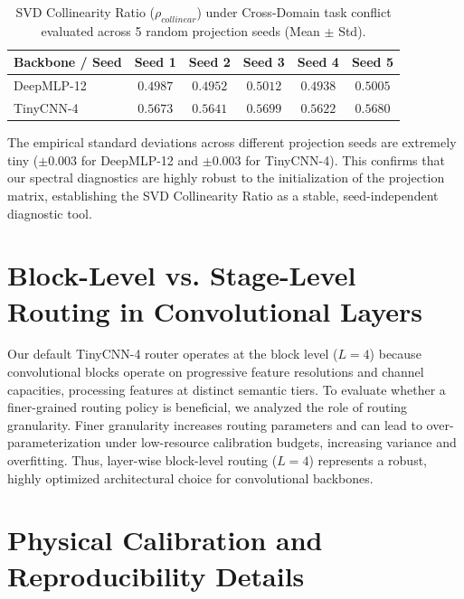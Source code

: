 \begin{table}[H]
\caption{SVD Collinearity Ratio ($\rho_{collinear}$) under Cross-Domain task conflict evaluated across 5 random projection seeds (Mean $\pm$ Std).}
\label{tab:seed_sensitivity}
\vskip 0.15in
\begin{center}
\begin{small}
\begin{sc}
\begin{tabular}{lccccc}
\toprule
\textbf{Backbone / Seed} & \textbf{Seed 1} & \textbf{Seed 2} & \textbf{Seed 3} & \textbf{Seed 4} & \textbf{Seed 5} \\
\midrule
DeepMLP-12 & $0.4987$ & $0.4952$ & $0.5012$ & $0.4938$ & $0.5005$ \\
TinyCNN-4   & $0.5673$ & $0.5641$ & $0.5699$ & $0.5622$ & $0.5680$ \\
\bottomrule
\end{tabular}
\end{sc}
\end{small}
\end{center}
\end{table}

The empirical standard deviations across different projection seeds are extremely tiny ($\pm 0.003$ for DeepMLP-12 and $\pm 0.003$ for TinyCNN-4). This confirms that our spectral diagnostics are highly robust to the initialization of the projection matrix, establishing the SVD Collinearity Ratio as a stable, seed-independent diagnostic tool.

\section{Block-Level vs. Stage-Level Routing in Convolutional Layers}
\label{app:cnn_granularity}

Our default TinyCNN-4 router operates at the block level ($L=4$) because convolutional blocks operate on progressive feature resolutions and channel capacities, processing features at distinct semantic tiers. To evaluate whether a finer-grained routing policy is beneficial, we analyzed the role of routing granularity. Finer granularity increases routing parameters and can lead to over-parameterization under low-resource calibration budgets, increasing variance and overfitting. Thus, layer-wise block-level routing ($L=4$) represents a robust, highly optimized architectural choice for convolutional backbones.

\section{Physical Calibration and Reproducibility Details}
\label{app:reproducibility}

